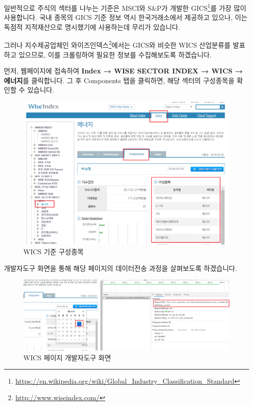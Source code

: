 \documentclass[]{book}
\let\rmarkdownfootnote\footnote%
\def\footnote{\protect\rmarkdownfootnote}
\begin{document}
일반적으로 주식의 섹터를 나누는 기준은 MSCI와 S\&P가 개발한 GICS\footnote{\url{https://en.wikipedia.org/wiki/Global_Industry_Classification_Standard}}를 가장 많이 사용합니다. 국내 종목의 GICS 기준 정보 역시 한국거래소에서 제공하고 있으나, 이는 독점적 지적재산으로 명시했기에 사용하는데 무리가 있습니다.

그러나 지수제공업체인 와이즈인덱스\footnote{\url{http://www.wiseindex.com/}}에서는 GICS와 비슷한 WICS 산업분류를 발표하고 있으므로, 이를 크롤링하여 필요한 정보를 수집해보도록 하겠습니다.

먼저, 웹페이지에 접속하여 \textbf{Index → WISE SECTOR INDEX → WICS → 에너지}를 클릭합니다. 그 후 Components 탭을 클릭하면, 해당 섹터의 구성종목을 확인할 수 있습니다.

\begin{figure}

{\centering \includegraphics[width=1\linewidth]{images/crawl_practice_wics} 

}

\caption{WICS 기준 구성종목}\label{fig:unnamed-chunk-20}
\end{figure}

개발자도구 화면을 통해 해당 페이지의 데이터전송 과정을 살펴보도록 하겠습니다.

\begin{figure}

{\centering \includegraphics[width=1\linewidth]{images/crawl_practice_wics2} 

}

\caption{WICS 페이지 개발자도구 화면}\label{fig:unnamed-chunk-21}
\end{figure}
\end{document}
